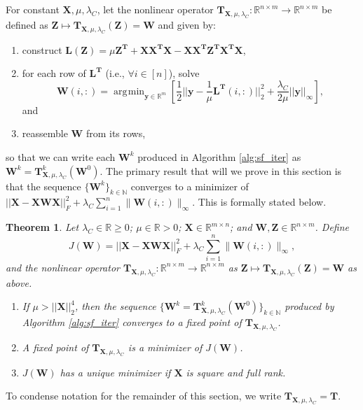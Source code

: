 \documentclass[12pt]{article}
\newtheorem{theorem}{Theorem}[section]
\DeclareMathOperator*{\argmin}{\arg\!\min}
\begin{document}
For constant $\mathbf{X}, \mu, \lambda_C$, let the nonlinear operator $\mathbf{T}_{\mathbf{X}, \mu, \lambda_C}: \mathbb{R}^{n \times m} \rightarrow \mathbb{R}^{n \times m}$ be defined as $\mathbf{Z} \mapsto \mathbf{T}_{\mathbf{X}, \mu, \lambda_C}(\mathbf{Z})=\mathbf{W}$ and given by:
\begin{enumerate}
    \item construct $\mathbf{L(Z)} = \mu \mathbf{Z^T} + \mathbf{XX^TX} - \mathbf{XX^TZ^TX^TX}$,
    \item for each row of $\mathbf{L^T}$ (i.e., $\forall i \in [n]$), solve 
    \[
        \mathbf{W}(i,:) = \argmin_{\mathbf{y} \in \mathbb{R}^m} \left[\frac{1}{2}||\mathbf{y}-\frac{1}{\mu}\mathbf{L^T}(i,:)||^2_2 + \frac{\lambda_C}{2\mu}||\mathbf{y}||_\infty\right],     
    \]
    and
    \item reassemble $\mathbf{W}$ from its rows,
\end{enumerate}
so that we can write each $\mathbf{W}^k$ produced in Algorithm \ref{alg:sf_iter} as $\mathbf{W}^k = \mathbf{T}^k_{\mathbf{X}, \mu, \lambda_C}(\mathbf{W}^0)$.  
The primary result that will we prove in this section is that the sequence $\{ \mathbf{W}^k \}_{k \in \mathbb{N}}$ converges to a minimizer of $||\mathbf{X-XWX}||_F^2 + \lambda_C \sum_{i=1}^n  \|\mathbf{W}(i,:) \|_{\infty}$.  This is formally stated below.

\begin{theorem}
\label{thm:alg2_correct}
Let $\lambda_C \in \mathbb{R} \geq 0$; $\mu \in \mathbb{R} > 0$; $\mathbf{X} \in \mathbb{R}^{m \times n}$; and $\mathbf{W}, \mathbf{Z} \in \mathbb{R}^{n \times m}$.  Define 
\begin{equation*}
J(\mathbf{W}) = ||\mathbf{X-XWX}||_F^2 + \lambda_C \sum_{i=1}^n \| \mathbf{W}(i,:) \|_{\infty}, 
\end{equation*}
and the nonlinear operator $\mathbf{T}_{\mathbf{X}, \mu, \lambda_C}: \mathbb{R}^{n \times m} \rightarrow \mathbb{R}^{n \times m}$ as $\mathbf{Z} \mapsto \mathbf{T}_{\mathbf{X}, \mu, \lambda_C}\mathbf{(Z)=W}$ as above.

\begin{enumerate}
    \item[a.] If $\mu > ||\mathbf{X}||_2^4$, then the sequence $\{\mathbf{W}^k = \mathbf{T}^k_{\mathbf{X}, \mu, \lambda_C}(\mathbf{W}^0)\}_{k \in \mathbb{N}}$ produced by Algorithm \ref{alg:sf_iter} converges to a fixed point of $\mathbf{T}_{\mathbf{X}, \mu, \lambda_C}$.
    \item[b.] A fixed point of $\mathbf{T}_{\mathbf{X}, \mu, \lambda_C}$ is a minimizer of $J(\mathbf{W})$.
    \item[c.] $J(\mathbf{W})$ has a unique minimizer if $\mathbf{X}$ is square and full rank.
\end{enumerate}
\end{theorem}
\noindent To condense notation for the remainder of this section, we write $\mathbf{T}_{\mathbf{X}, \mu, \lambda_C} = \mathbf{T}$.
\end{document}
